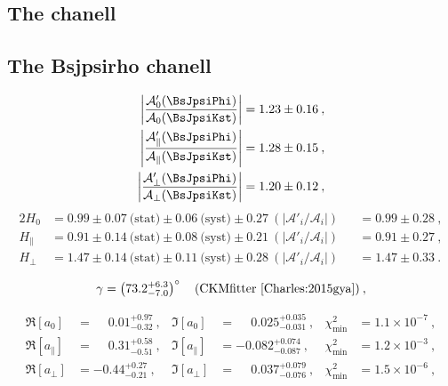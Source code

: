 
\subsection{The \BsJpsiPhi chanell}

\subsection{The Bsjpsirho chanell}

\begin{align}
\left|\frac{\mathcal{A}'_0(\BsJpsiPhi)}{\mathcal{A}_0(\BsJpsiKst)}\right| & = 1.23 \pm 0.16\:,\label{Eq:AmpRat_JpsiKstar_long}\\
\left|\frac{\mathcal{A}'_{\parallel}(\BsJpsiPhi)}{\mathcal{A}_{\parallel}(\BsJpsiKst)}\right| & = 1.28 \pm 0.15\:,\\
\left|\frac{\mathcal{A}'_{\perp}(\BsJpsiPhi)}{\mathcal{A}_{\perp}(\BsJpsiKst)}\right| & = 1.20 \pm 0.12\:,\label{Eq:AmpRat_JpsiKstar_perp}
\end{align}
\begin{alignat}{2}
H_0 & = 0.99 \pm 0.07\:\text{(stat)} \pm 0.06\:\text{(syst)} \pm 0.27\:(|\mathcal{A}'_i/\mathcal{A}_i|) && = 0.99 \pm 0.28\:,\\
H_\parallel & = 0.91 \pm 0.14\:\text{(stat)} \pm 0.08\:\text{(syst)} \pm 0.21\:(|\mathcal{A}'_i/\mathcal{A}_i|) && = 0.91 \pm 0.27\:,\\
H_\perp & = 1.47 \pm 0.14\:\text{(stat)} \pm 0.11\:\text{(syst)} \pm 0.28\:(|\mathcal{A}'_i/\mathcal{A}_i|) && = 1.47 \pm 0.33\:.
\end{alignat}

\begin{equation}\label{Eq:Gamma_GC}
\gamma  = \left(73.2_{-7.0}^{+6.3}\right)^{\circ} \quad\text{(CKMfitter \cite{Charles:2015gya})}\:,
\end{equation}

\begin{align}
\Re[a_0] & = \phantom{-}0.01_{-0.32}^{+0.97}\:, & \Im[a_0] & = \phantom{-}0.025_{-0.031}^{+0.035}\:, & \chi^2_{\text{min}} & = 1.1 \times 10^{-7}\:,\label{Eq:Pen_Re_Im_Long}\\
%
\Re[a_\parallel] & = \phantom{-}0.31_{-0.51}^{+0.58}\:, & \Im[a_\parallel] & = -0.082_{-0.087}^{+0.074}\:,& \chi^2_{\text{min}} & = 1.2 \times 10^{-3}\:,\label{Eq:Pen_Re_Im_Para}\\
%
\Re[a_\perp] & = -0.44_{-0.21}^{+0.27}\:, & \Im[a_\perp] & = \phantom{-}0.037_{-0.076}^{+0.079}\:,& \chi^2_{\text{min}} & = 1.5 \times 10^{-6}\:,\label{Eq:Pen_Re_Im_Perp}
\end{align}

